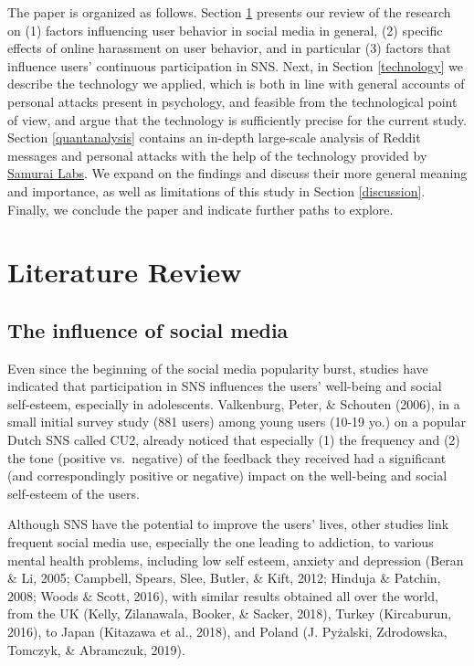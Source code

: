 \documentclass[10pt,dvipsnames]{scrartcl}
\begin{document}
The paper is organized as follows. Section \ref{literaturereview}
presents our review of the research on (1) factors influencing user
behavior in social media in general, (2) specific effects of online
harassment on user behavior, and in particular (3) factors that
influence users' continuous participation in SNS. Next, in Section
\ref{technology} we describe the technology we applied, which is both in
line with general accounts of personal attacks present in psychology,
and feasible from the technological point of view, and argue that the
technology is sufficiently precise for the current study. Section
\ref{quantanalysis} contains an in-depth large-scale analysis of Reddit
messages and personal attacks with the help of the technology provided
by \href{https://www.samurailabs.ai/}{\textsf{Samurai Labs}}. We expand
on the findings and discuss their more general meaning and importance,
as well as limitations of this study in Section \ref{discussion}.
Finally, we conclude the paper and indicate further paths to explore.

\section{Literature Review}
\label{literaturereview}

\subsection{The influence of  social media}

Even since the beginning of the social media popularity burst, studies
have indicated that participation in SNS influences the users'
well-being and social self-esteem, especially in adolescents.
Valkenburg, Peter, \& Schouten (2006), in a small initial survey study
(881 users) among young users (10-19 yo.) on a popular Dutch SNS called
CU2, already noticed that especially (1) the frequency and (2) the tone
(positive vs.~negative) of the feedback they received had a significant
(and correspondingly positive or negative) impact on the well-being and
social self-esteem of the users.

Although SNS have the potential to improve the users' lives, other
studies link frequent social media use, especially the one leading to
addiction, to various mental health problems, including low self esteem,
anxiety and depression (Beran \& Li, 2005; Campbell, Spears, Slee,
Butler, \& Kift, 2012; Hinduja \& Patchin, 2008; Woods \& Scott, 2016),
with similar results obtained all over the world, from the UK (Kelly,
Zilanawala, Booker, \& Sacker, 2018), Turkey (Kircaburun, 2016), to
Japan (Kitazawa et al., 2018), and Poland (J. Pyżalski, Zdrodowska,
Tomczyk, \& Abramczuk, 2019).
\end{document}
